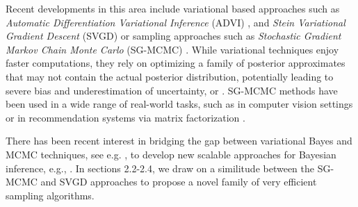 Recent developments in this area include variational based approaches such as \emph{Automatic Differentiation Variational Inference} (ADVI) \parencite{blei2017variational}, and \emph{Stein Variational Gradient Descent} (SVGD)  \parencite{liu2016stein} or sampling approaches such as \emph{Stochastic Gradient Markov Chain Monte Carlo} (SG-MCMC) \parencite{ma2015complete}. While variational techniques enjoy faster computations, they rely on optimizing a family of posterior approximates that may not contain the actual posterior distribution, potentially leading to severe bias and underestimation of uncertainty, \parencite{pmlr-v80-yao18a} or \parencite{riquelme2018failure}. SG-MCMC methods have been used in a wide range of real-world tasks, such as in computer vision settings \parencite{7780980} or in recommendation systems via matrix factorization \parencite{7952555}.%

There has been recent interest in bridging the gap between variational Bayes and MCMC techniques, see e.g. \parencite{zhang2018}, to develop new scalable approaches for Bayesian inference, e.g., \parencite{carbonetto2012}.
In sections 2.2-2.4, we draw on a similitude between the SG-MCMC and SVGD approaches to propose a novel family of very efficient sampling algorithms. 

